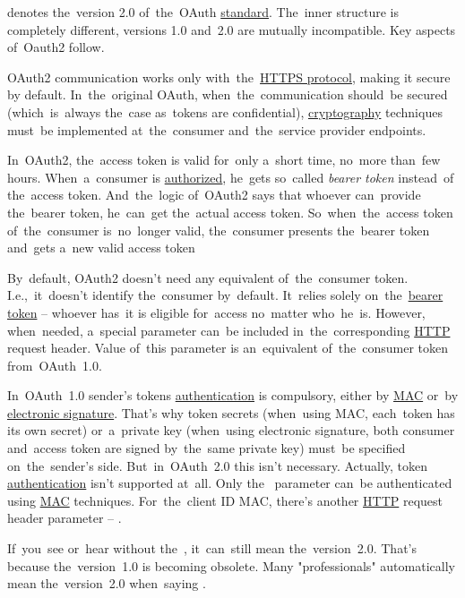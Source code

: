  denotes the~version 2.0 of~the~OAuth \hyperref[protocolstandard]{standard}.
The~inner structure is completely different, versions 1.0 \mbox{and 2.0} are mutually incompatible.
Key aspects of~Oauth2 follow.

OAuth2 communication works only with~the~\hyperref[https]{HTTPS protocol}, making it secure by default.
In~the~original OAuth, when~the~communication should~be secured (which~is~always the~case as~tokens are confidential), \hyperref[cryptography]{cryptography} techniques must~be implemented at~the~consumer and~the~service provider endpoints.

\label{oauth2accesstokenvalidity}
In~OAuth2, the~access token is valid for~only a~short time, no~more than~few hours.
When~a~consumer is \hyperref[authenticationauthorization]{authorized}, he~gets so~called \textit{bearer token} instead~of the~access token.
And~the~logic of~OAuth2 says that whoever can~provide the~bearer token, he~can~get the~actual access token.
So~when~the~access token of~the~consumer is~no~longer valid, the~consumer presents the~bearer token and~gets a~new valid access token

\label{oauth2consumerauthentication}
By~default, OAuth2 doesn't need any equivalent of~the~consumer token.
I.e.,~it~doesn't identify the~consumer by~default.
It~relies solely on~the~\hyperref[oauth2accesstokenvalidity]{bearer token} -- whoever has~it is eligible for~access no~matter who~he~is.
However, when~needed, a~special parameter  can~be included in~the~corresponding \hyperref[http]{HTTP} request header.
Value of~this parameter is an~equivalent of~the~consumer token \mbox{from OAuth 1.0.}

\mbox{In OAuth 1.0} sender's tokens \hyperref[authenticationauthorization]{authentication} is compulsory, either by \hyperref[mac]{MAC} or~by \hyperref[electronicsignature]{electronic signature}.
That's why token secrets (when~using MAC, each~token has its own secret) or~a~private key (when~using electronic signature, both consumer and~access token are signed by~the~same private key) must~be specified on~the~sender's side.
\mbox{But in OAuth 2.0} this isn't necessary.
Actually, token \hyperref[authenticationauthorization]{authentication} isn't supported at~all.
Only the~\hyperref[oauth2consumerauthentication]{} parameter can~be authenticated using \hyperref[mac]{MAC} techniques.
For~the~client ID MAC, there's another \hyperref[http]{HTTP} request header parameter -- \mbox{.}

\warning If~you~see or~hear  without \mbox{the }, it~can~still mean the~version~\mbox{2.0.}
That's because the~version~\mbox{1.0} is becoming obsolete.
Many "professionals" automatically mean the~version~\mbox{2.0} when~saying .

